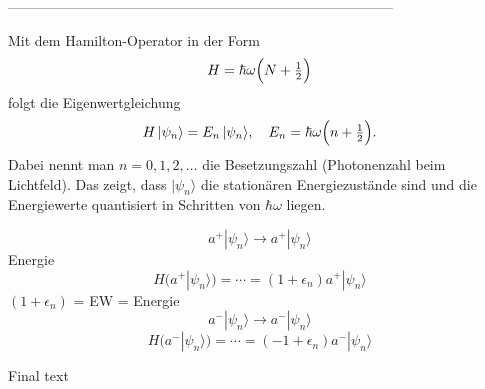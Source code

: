 


-----------------------------------------------------------------------------------

Mit dem Hamilton-Operator in der Form
\begin{equation}
	H = \hbar\omega\Bigl(N + \tfrac12\Bigr)
\end{equation}
folgt die Eigenwertgleichung
\begin{equation}
	H\,|\psi_n\rangle = E_n\,|\psi_n\rangle,
  	\quad
	E_n = \hbar\omega\Bigl(n + \tfrac12\Bigr).
\end{equation}
Dabei nennt man $n = 0,1,2,\dots$ die Besetzungszahl (Photonenzahl beim Lichtfeld).
Das zeigt, dass $|\psi_n\rangle$ die stationären Energiezustände sind und die Energiewerte quantisiert in Schritten von $\hbar\omega$ liegen.

\begin{equation}
	a^+ |\psi_n\rangle \rightarrow a^+ | \psi_n\rangle
\end{equation}
Energie
\begin{equation}
	H(a^+ | \psi_n\rangle) = \cdots
	= (1 + \epsilon_n) a^+ | \psi_n\rangle %
\end{equation}
$(1+\epsilon_n)$ = EW = Energie %
\begin{equation}
	a^- |\psi_n\rangle \rightarrow a^-|\psi_n\rangle
\end{equation}
\begin{equation}
	H(a^-|\psi_n\rangle) = \cdots
	= (-1 + \epsilon_n) a^- |\psi_n\rangle %
\end{equation}

Final text %
